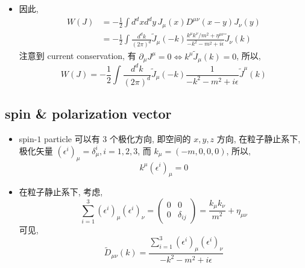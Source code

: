 \begin{itemize}
	\item 因此,
	\begin{align}
		W(J) &= - \frac{1}{2} \int d^d x d^d y \, J_\mu(x) D^{\mu \nu}(x - y) J_\nu(y) \\
		&= - \frac{1}{2} \int \frac{d^d k}{(2 \pi)^d} \tilde{J}_\mu(- k) \frac{k^\mu k^\nu / m^2 + \eta^{\mu \nu}}{- k^2 - m^2 + i \epsilon} \tilde{J}_\nu(k)
	\end{align}
	注意到 current conservation, 有 $\partial_\mu J^\mu = 0 \iff k^\mu \tilde{J}_\mu(k) = 0$, 所以,
	\begin{equation}
		W(J) = - \frac{1}{2} \int \frac{d^d k}{(2 \pi)^d} \tilde{J}_\mu(- k) \frac{1}{- k^2 - m^2 + i \epsilon} \tilde{J}^\mu(k)
	\end{equation}
\end{itemize}

\subsection{spin \& polarization vector} \label{3.1.1}
\begin{itemize}
	\item spin-$1$ particle 可以有 3 个极化方向, 即空间的 $x, y, z$ 方向, 在粒子静止系下, 极化矢量 $(\epsilon^i)_\mu = \delta^i_\mu, i = 1, 2, 3$, 而 $k_\mu = (- m, 0, 0, 0)$, 所以,
	\begin{equation}
		k^\mu (\epsilon^i)_\mu = 0
	\end{equation}
	
	\item 在粒子静止系下, 考虑,
	\begin{equation}
		\sum_{i = 1}^3 (\epsilon^i)_\mu (\epsilon^i)_\nu = \begin{pmatrix}
			0 & 0 \\
			0 & \delta_{i j}
		\end{pmatrix} = \frac{k_\mu k_\nu}{m^2} + \eta_{\mu \nu}
	\end{equation}
	可见,
	\begin{equation}
		\tilde{D}_{\mu \nu}(k) = \frac{\sum_{i = 1}^3 (\epsilon^i)_\mu (\epsilon^i)_\nu}{- k^2 - m^2 + i \epsilon}
	\end{equation}
\end{itemize}

